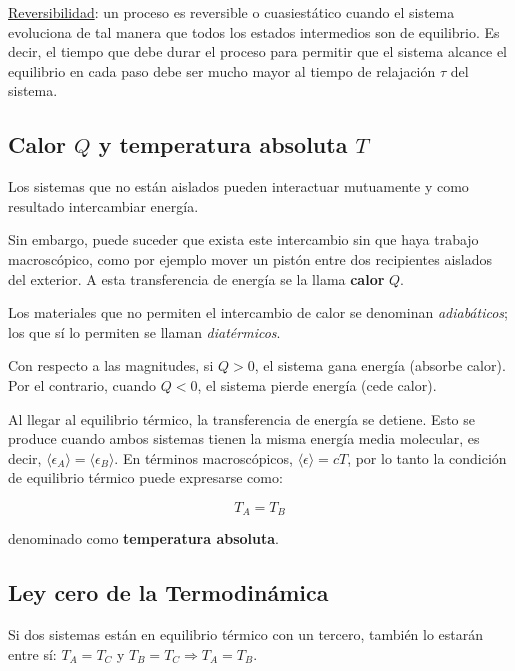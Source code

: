 \documentclass[a4paper]{article}
\begin{document}
\underline{Reversibilidad}: un proceso es reversible o cuasiest\'atico cuando el sistema evoluciona de tal manera que todos los estados intermedios son de equilibrio. Es decir, el tiempo que debe durar el proceso para permitir que el sistema alcance el equilibrio en cada paso debe ser mucho mayor al tiempo de relajaci\'on $\tau$ del sistema.

\subsection{Calor $Q$ y temperatura absoluta $T$}

Los sistemas que no est\'an aislados pueden interactuar mutuamente y como resultado intercambiar energ\'ia.\newline

Sin embargo, puede suceder que exista este intercambio sin que haya trabajo macrosc\'opico, como por ejemplo mover un pist\'on entre dos recipientes aislados del exterior. A esta transferencia de energ\'ia se la llama \textbf{calor} $Q$.\newline

Los materiales que no permiten el intercambio de calor se denominan \textit{adiab\'aticos}; los que s\'i lo permiten se llaman \textit{diat\'ermicos}.\newline

Con respecto a las magnitudes, si $Q > 0$, el sistema gana energ\'ia (absorbe calor). Por el contrario, cuando $Q < 0$, el sistema pierde energ\'ia (cede calor).\newline

Al llegar al equilibrio t\'ermico, la transferencia de energ\'ia se detiene. Esto se produce cuando ambos sistemas tienen la misma energ\'ia media molecular, es decir, $\langle \epsilon_{A} \rangle = \langle \epsilon_{B} \rangle$. En t\'erminos macrosc\'opicos, $\langle \epsilon \rangle = cT$, por lo tanto la condici\'on de equilibrio t\'ermico puede expresarse como:

$$T_{A} = T_{B}$$

denominado como \textbf{temperatura absoluta}.\newline


\subsection{Ley cero de la Termodin\'amica}

Si dos sistemas est\'an en equilibrio t\'ermico con un tercero, tambi\'en lo estar\'an entre s\'i: $T_{A} = T_{C}$ y $T_{B} = T_{C} \Rightarrow T_{A} = T_{B}$.
\end{document}
